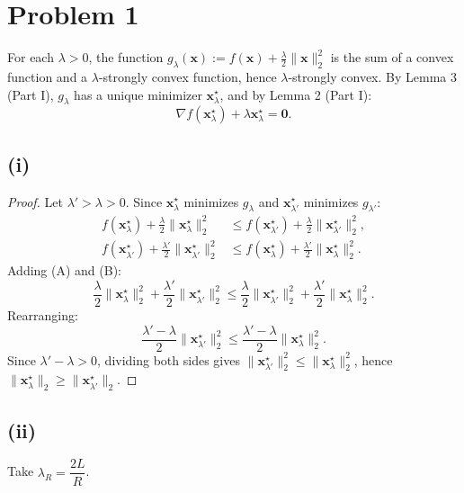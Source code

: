 \section*{Problem 1}

For each $\lambda > 0$, the function $g_\lambda(\mathbf{x}) := f(\mathbf{x}) + \frac{\lambda}{2}\|\mathbf{x}\|_2^2$ is the sum of a convex function and a $\lambda$-strongly convex function, hence $\lambda$-strongly convex. By Lemma 3 (Part I), $g_\lambda$ has a unique minimizer $\mathbf{x}_\lambda^\star$, and by Lemma 2 (Part I):
\[
\nabla f(\mathbf{x}_\lambda^\star) + \lambda \mathbf{x}_\lambda^\star = \mathbf{0}.
\]

\subsection*{(i)}

\begin{proof}
Let $\lambda' > \lambda > 0$. Since $\mathbf{x}_\lambda^\star$ minimizes $g_\lambda$ and $\mathbf{x}_{\lambda'}^\star$ minimizes $g_{\lambda'}$:
\begin{align*}
f(\mathbf{x}_\lambda^\star) + \frac{\lambda}{2}\|\mathbf{x}_\lambda^\star\|_2^2 &\leq f(\mathbf{x}_{\lambda'}^\star) + \frac{\lambda}{2}\|\mathbf{x}_{\lambda'}^\star\|_2^2, \tag{A} \\
f(\mathbf{x}_{\lambda'}^\star) + \frac{\lambda'}{2}\|\mathbf{x}_{\lambda'}^\star\|_2^2 &\leq f(\mathbf{x}_\lambda^\star) + \frac{\lambda'}{2}\|\mathbf{x}_\lambda^\star\|_2^2. \tag{B}
\end{align*}
Adding (A) and (B):
\[
\frac{\lambda}{2}\|\mathbf{x}_\lambda^\star\|_2^2 + \frac{\lambda'}{2}\|\mathbf{x}_{\lambda'}^\star\|_2^2 \leq \frac{\lambda}{2}\|\mathbf{x}_{\lambda'}^\star\|_2^2 + \frac{\lambda'}{2}\|\mathbf{x}_\lambda^\star\|_2^2.
\]
Rearranging:
\[
\frac{\lambda' - \lambda}{2}\|\mathbf{x}_{\lambda'}^\star\|_2^2 \leq \frac{\lambda' - \lambda}{2}\|\mathbf{x}_\lambda^\star\|_2^2.
\]
Since $\lambda' - \lambda > 0$, dividing both sides gives $\|\mathbf{x}_{\lambda'}^\star\|_2^2 \leq \|\mathbf{x}_\lambda^\star\|_2^2$, hence $\|\mathbf{x}_\lambda^\star\|_2 \geq \|\mathbf{x}_{\lambda'}^\star\|_2$.
\end{proof}

\subsection*{(ii)}

Take $\lambda_R = \dfrac{2L}{R}$.


